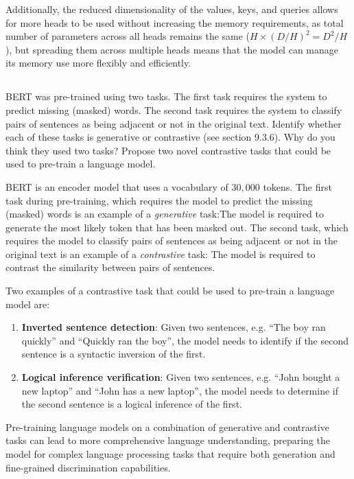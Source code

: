 \documentclass[12pt]{report}
\begin{document}
Additionally, the reduced dimensionality of the values, keys, and queries allows for more heads to be used without increasing the memory requirements, as total number of parameters across all heads remains the same ($H \times (D/H)^{2} = D^{2}/H$), but spreading them across multiple heads means that the model can manage its memory use more flexibly and efficiently.

\subsection{}
\begin{mdframed}
    BERT was pre-trained using two tasks. The first task requires the system to predict missing (masked) words. The second task requires the system to classify pairs of sentences as being adjacent or not in the original text. Identify whether each of these tasks is generative or contrastive (see section 9.3.6). Why do you think they used two tasks? Propose two novel contrastive tasks that could be used to pre-train a language model.
\end{mdframed}

BERT is an encoder model that uses a vocabulary of $30,000$ tokens. The first task during pre-training, which requires the model to predict the missing (masked) words is an example of a \textit{generative} task:The model is required to generate the most likely token that has been masked out. The second task, which requires the model to classify pairs of sentences as being adjacent or not in the original text is an example of a \textit{contrastive} task: The model is required to contrast the similarity between pairs of sentences.

Two examples of a contrastive task that could be used to pre-train a language model are:

\begin{enumerate}
    \item \textbf{Inverted sentence detection}: Given two sentences, e.g. ``The boy ran quickly'' and ``Quickly ran the boy'', the model needs to identify if the second sentence is a syntactic inversion of the first.
    \item \textbf{Logical inference verification}: Given two sentences, e.g. ``John bought a new laptop'' and ``John has a new laptop'', the model needs to determine if the second sentence is a logical inference of the first.
\end{enumerate}

Pre-training language models on a combination of generative and contrastive tasks can lead to more comprehensive language understanding, preparing the model for complex language processing tasks that require both generation and fine-grained discrimination capabilities.
\end{document}

